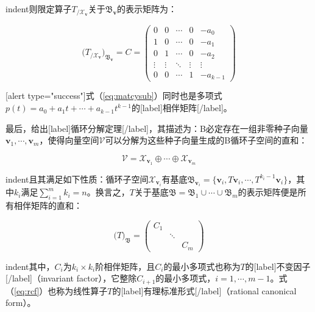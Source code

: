 \documentclass[UTF8,nofonts]{ctexart}
\begin{document}
indent则限定算子$T_{/\mathcal{X}_{\boldsymbol{v}}}$关于$\mathfrak{B}_{\boldsymbol{v}}$的表示矩阵为：

\begin{equation}
\label{eq:matcysub}
\Big(T_{/\mathcal{X}_{\boldsymbol{v}}}\Big)_{\mathfrak{B}_{\mathbf{v}}}=C=
\begin{pmatrix}
0 & 0 & \cdots & 0 & -a_0 \\
1 & 0 & \cdots & 0 & -a_1 \\
0 & 1 & \cdots & 0 & -a_2 \\
\vdots & \vdots & \ddots & \vdots & \vdots \\
0 & 0 & \cdots & 1 & -a_{k-1}
\end{pmatrix}
\end{equation}

[alert type="success"]式（\ref{eq:matcysub}）同时也是多项式$p(t)=a_0+a_1t+\cdots+a_{k-1}t^{k-1}$的[label]相伴矩阵[/label]。

最后，给出[label]循环分解定理[/label]，其描述为：B必定存在一组非零种子向量$\boldsymbol{v}_1,\cdots,\boldsymbol{v}_m$，使得向量空间$\mathcal{V}$可以分解为这些种子向量生成的B循环子空间的直和：

\[\mathcal{V}=\mathcal{X}_{\boldsymbol{v}_1}\oplus\cdots\oplus\mathcal{X}_{\boldsymbol{v}_m}\]

indent且其满足如下性质：循环子空间$\mathcal{X}_{\boldsymbol{v}_i}$有基底$\mathfrak{B}_{\boldsymbol{v}_i}=\{\boldsymbol{v}_i,T\boldsymbol{v}_i,\cdots,T^{k_i-1}\boldsymbol{v}_i\}$，其中$k_i$满足$\sum_{i=1}^mk_i=n$。换言之，$T$关于基底$\mathfrak{B}=\mathfrak{B}_1\cup\cdots\cup\mathfrak{B}_m$的表示矩阵便是所有相伴矩阵的直和：

\begin{equation}
\label{eq:rcf}
\Big(T\Big)_{\mathfrak{B}}=
\begin{pmatrix}
C_1 & & \\
& \ddots & \\
& & C_m
\end{pmatrix}
\end{equation}

indent其中，$C_i$为$k_i \times k_i$阶相伴矩阵，且$C_i$的最小多项式也称为$T$的[label]不变因子[/label]（invariant factor），它整除$C_{i+1}$的最小多项式，$i=1,\cdots,m-1$。式（\ref{eq:rcf}）也称为线性算子$T$的[label]有理标准形式[/label]（rational canonical form）。
\end{document}
